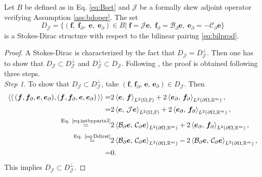 \begin{proposition}\label{prop:stdir}
Let $B$ be defined as in Eq. \eqref{eq:Bset} and $\mathcal{J}$ be a formally skew adjoint operator verifying Assumption \ref{ass:bdoper}. The set
\begin{equation}\label{eq:Ddirst}
D_{\mathcal{J}} = \{(\bm{f}, \; \bm{f}_\partial, \; \bm{e}, \; \bm{e}_\partial) \in B\vert \; \bm{f} = \mathcal{J} \bm{e}, \; \bm{f}_\partial = \mathcal{B}_\partial \bm{e}, \; \bm{e}_\partial = -\mathcal{C}_\partial \bm{e}\} 
\end{equation}
is a Stokes-Dirac structure with respect to the bilinear pairing \eqref{eq:bilprod}.
\begin{proof}
A Stokes-Dirac is characterized by the fact that ${D}_{\mathcal{J}} = {D}_{\mathcal{J}}^\perp$. Then one has to show that ${D}_{\mathcal{J}} \subset {D}_{\mathcal{J}}^\perp$ and ${D}_{\mathcal{J}}^\perp \subset {D}_{\mathcal{J}}$. Following \cite{legorrec2005}, the proof is obtained following three steps. \\

\textit{Step 1}. To show that ${D}_{\mathcal{J}} \subset {D}_{\mathcal{J}}^\perp$, take $(\bm{f}, \, \bm{f}_\partial, \, \bm{e}, \, \bm{e}_\partial) \in {D}_{\mathcal{J}}$. Then
\begin{align*}
\bilprod{(\bm{f}, \bm{f}_{\partial}, \bm{e}, \bm{e}_{\partial})}{(\bm{f}, \bm{f}_{\partial}, \bm{e}, \bm{e}_{\partial})} =& 2 \inner[L^2(\Omega, \bbF)]{\bm{e}}{\bm{f}} + 2 \inner[L^2(\partial\Omega, \bbR^m)]{\bm{e}_{\partial}}{\bm{f}_{\partial}}, \\
=& 2 \inner[L^2(\Omega, \bbF)]{\bm{e}}{\mathcal{J}\bm{e}} + 2 \inner[L^2(\partial\Omega, \bbR^m)]{\bm{e}_{\partial}}{\bm{f}_{\partial}}, \\
\stackrel{\text{Eq. \eqref{eq:intbypartsJ}}}{=}& 2 \inner[L^2(\partial\Omega, \bbR^m)]{\mathcal{B}_\partial \bm{e}}{\mathcal{C}_\partial \bm{e}} + 2 \inner[L^2(\partial\Omega, \bbR^m)]{\bm{e}_{\partial}}{\bm{f}_{\partial}}, \\
\stackrel{\text{Eq. \eqref{eq:Ddirst}}}{=}&  2 \inner[L^2(\partial\Omega, \bbR^m)]{\mathcal{B}_\partial \bm{e}}{\mathcal{C}_\partial \bm{e}} - 2 \inner[L^2(\partial\Omega, \bbR^m)]{\mathcal{B}_\partial \bm{e}}{\mathcal{C}_\partial \bm{e}}, \\
=& 0.
\end{align*}
This implies ${D}_{\mathcal{J}} \subset {D}_{\mathcal{J}}^\perp$.


\end{proof}
\end{proposition}
